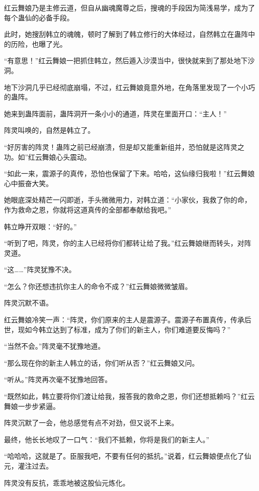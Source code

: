 
\begin{this_body}

红云舞娘乃是主修云道，但自从幽魂魔尊之后，搜魂的手段因为简浅易学，成为了每个蛊仙的必备手段。

此时，她搜刮韩立的魂魄，顿时了解到了韩立修行的大体经过，自然韩立在蛊阵中的历险，也曝了光。

“有意思！”红云舞娘一把抓住韩立，然后遁入沙漠当中，很快就来到了那处地下沙洞。

地下沙洞几乎已经彻底崩塌，不过，红云舞娘竟意外地，在角落里发现了一个小巧的蛊阵。

她来到蛊阵面前，蛊阵洞开一条小小的通道，阵灵在里面开口：“主人！”

阵灵叫唤的，自然是韩立了。

“好厉害的阵灵！蛊阵之前已经崩溃，但是却又能重新组并，恐怕就是这阵灵之功。如”红云舞娘心头震动。

“如此一来，震源子的真传，恐怕也保留了下来。哈哈，这仙缘归我啦！”红云舞娘心中振奋大笑。

她眼底深处精芒一闪即逝，手头微微用力，对韩立道：“小家伙，我救了你的命，作为救命之恩，你就将这道真传的全部都奉献给我吧。”

韩立睁开双眼：“好的。”

“听到了吧，阵灵，你的主人已经将你们都转让给了我。”红云舞娘继而转头，对阵灵道。

“这……”阵灵犹豫不决。

“怎么？你还想违抗你主人的命令不成？”红云舞娘微微皱眉。

阵灵沉默不语。

红云舞娘冷笑一声：“阵灵，你们原来的主人是震源子。震源子布置真传，传承后世，现如今韩立达到了标准，成为了你们的新主人，你们难道要反悔吗？”

“当然不会。”阵灵毫不犹豫地道。

“那么现在你的新主人韩立的话，你们听从否？”红云舞娘又问。

“听从。”阵灵再次毫不犹豫地回答。

“既然如此，韩立要将你们渡让给我，报答我的救命之恩，你们还想抵赖吗？”红云舞娘一步步紧逼。

阵灵沉默了一会，他总感觉有点不对劲，但又说不上来。

最终，他长长地叹了一口气：“我们不抵赖，你将是我们的新主人。”

“哈哈哈，这就是了。臣服我吧，不要有任何的抵抗。”说着，红云舞娘便点化了仙元，灌注过去。

阵灵没有反抗，乖乖地被这股仙元炼化。


\end{this_body}
